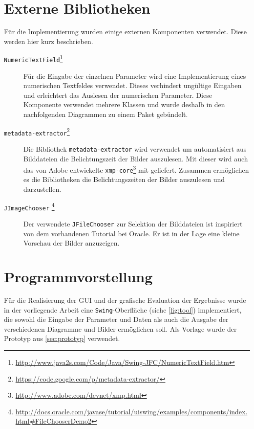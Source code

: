 \section{Externe Bibliotheken}
\label{externals}
Für die Implementierung wurden einige externen Komponenten verwendet. Diese werden hier kurz beschrieben.
\begin{description}
\item[\texttt{NumericTextField}\footnote{\url{http://www.java2s.com/Code/Java/Swing-JFC/NumericTextField.htm}}]
Für die Eingabe der einzelnen Parameter wird eine Implementierung eines numerischen Textfeldes verwendet. Dieses verhindert ungültige Eingaben und erleichtert das Auslesen der numerischen Parameter. Diese Komponente verwendet mehrere Klassen und wurde deshalb in den nachfolgenden Diagrammen zu einem Paket gebündelt.

\item[\texttt{metadata-extractor}\footnote{\url{https://code.google.com/p/metadata-extractor/}}]
Die Bibliothek \texttt{metadata-extractor} wird verwendet um automatisiert aus Bilddateien die Belichtungszeit der Bilder auszulesen. Mit dieser wird auch das von Adobe entwickelte \texttt{xmp-core}\footnote{\url{http://www.adobe.com/devnet/xmp.html}} mit geliefert. Zusammen ermöglichen es die Bibliotheken die Belichtungszeiten der Bilder auszulesen und darzustellen.

\item[\texttt{JImageChooser} \footnote{\url{http://docs.oracle.com/javase/tutorial/uiswing/examples/components/index.html\#FileChooserDemo2}}]
Der verwendete \texttt{JFileChooser} zur Selektion der Bilddateien ist inspiriert von dem vorhandenen Tutorial bei Oracle. Er ist in der Lage eine kleine Vorschau der Bilder anzuzeigen.
\end{description}



\section{Programmvorstellung}

Für die Realisierung der \gls{GUI} und der grafische Evaluation der Ergebnisse wurde in der vorliegende Arbeit eine \texttt{Swing}-Oberfläche (siehe \autoref{fig:tool}) implementiert, die sowohl die Eingabe der Parameter und Daten als auch die Ausgabe der verschiedenen Diagramme und Bilder ermöglichen soll. Als Vorlage wurde der Prototyp aus \autoref{sec:prototyp} verwendet.

